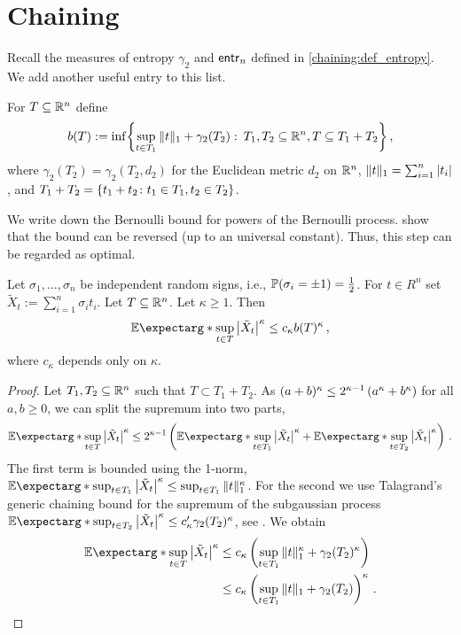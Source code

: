 \section{Chaining}\label{app:chaining}
%
Recall the measures of entropy $\gamma_2$ and $\operatorname{\mathsf{entr}_\mathit{n}}$ defined in \autoref{chaining:def_entropy}. We add another useful entry to this list.
\begin{definition}\label{chaining:entropy}
	For $T \subseteq \mathbb{R}^n$ define
	\begin{equation*}
		b(T) := \inf\mathopen{}\left\lbrace \sup_{t\in T_1} \Vert t \Vert_1 + \gamma_2(T_2)\,\colon\, T_1, T_2 \subseteq \mathbb{R}^n, T \subseteq T_1+T_2 \right\rbrace\mathclose{}
		\, ,
	\end{equation*}
	where $\gamma_2(T_2) = \gamma_2(T_2, d_2)$ for the Euclidean metric $d_2$ on $\mathbb{R}^n$, $\Vert t \Vert_1 = \sum_{i=1}^n \left| t_i \right|$, and $T_1 + T_2 = \left\lbrace t_1 + t_2 \colon t_1 \in T_1, t_2 \in T_2 \right\rbrace$.
\end{definition}
%
We write down the Bernoulli bound for powers of the Bernoulli process. \cite{bednorz14} show that the bound can be reversed (up to an universal constant). Thus, this step can be regarded as optimal.
%
\begin{theorem}\label{chaining:bernoulli}
	Let $\sigma_1, \dots, \sigma_n$ be independent random signs, i.e., $\mathbb{P}(\sigma_i = \pm1) =\frac12$.
	For $t\in R^n$ set $\tilde X_t :=\sum_{i=1}^n \sigma_i t_i$. Let $T \subseteq \mathbb{R}^n$.
	Let $\kappa \geq 1$.
	Then 
	\begin{equation*}
		\Ex*{\sup_{t\in T} \abs{\tilde X_t}^\kappa} \leq c_\kappa b(T)^\kappa
		\eqcm
	\end{equation*}
	where $c_\kappa$ depends only on $\kappa$.
\end{theorem}
%
\begin{proof}
Let $T_1, T_2 \subseteq \mathbb{R}^n$ such that $T \subset T_1 + T_2$.
As $(a+b)^\kappa \leq 2^{\kappa-1}\left( a^\kappa + b^\kappa \right)$ for all $a,b\geq 0$, we can split the supremum into two parts,
\begin{align*}
\Ex*{\sup_{t\in T} \abs{\tilde X_t}^\kappa} 
\leq
2^{\kappa-1} \br{\Ex*{\sup_{t\in T_1} \abs{\tilde X_t}^\kappa}  + \Ex*{\sup_{t\in T_2} \abs{\tilde X_t}^\kappa}}
\eqfs
\end{align*}
The first term is bounded using the 1-norm,
$\Ex*{\sup_{t\in T_1} \abs{\tilde X_t}^\kappa} \leq \sup_{t\in T_1} \normof{t}_1^\kappa$. For the second we use Talagrand's generic chaining bound for the supremum of the subgaussian process $\Ex*{\sup_{t\in T_2} \abs{\tilde X_t}^\kappa} \leq c_\kappa\pr \gamma_2(T_2)^\kappa$, see \cite{talagrand14}. We obtain
\begin{align*}
\Ex*{\sup_{t\in T} \abs{\tilde X_t}^\kappa} 
&\leq 
c_\kappa \br{\sup_{t\in T_1} \normof{t}_1^\kappa + \gamma_2(T_2)^\kappa}
\\&\leq 
c_\kappa \br{\sup_{t\in T_1} \normof{t}_1 + \gamma_2(T_2)}^\kappa
\eqfs
\end{align*}
\end{proof}

